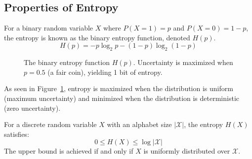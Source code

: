 \subsection{Properties of Entropy}

For a binary random variable $X$ where $P(X=1) = p$ and $P(X=0) = 1-p$, the entropy is known as the binary entropy function, denoted $H(p)$.
\begin{equation}
    H(p) = -p \log_2 p - (1-p) \log_2 (1-p)
\end{equation}

\begin{figure}[ht]
    \centering
    \caption{The binary entropy function $H(p)$. Uncertainty is maximized when $p=0.5$ (a fair coin), yielding 1 bit of entropy.}
    \label{fig:binary_entropy}
\end{figure}

As seen in Figure~\ref{fig:binary_entropy}, entropy is maximized when the distribution is uniform (maximum uncertainty) and minimized when the distribution is deterministic (zero uncertainty).

\begin{theorem}
\label{thm:max_entropy}
For a discrete random variable $X$ with an alphabet size $|\mathcal{X}|$, the entropy $H(X)$ satisfies:
\begin{equation}
    0 \leq H(X) \leq \log |\mathcal{X}|
\end{equation}
The upper bound is achieved if and only if $X$ is uniformly distributed over $\mathcal{X}$.
\end{theorem}

